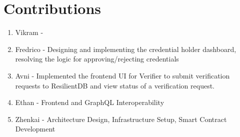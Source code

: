 \section{Contributions}

\begin{enumerate}
    \item Vikram -
    \item Fredrico - Designing and implementing the credential holder dashboard, resolving the logic for approving/rejecting credentials
    \item Avni - Implemented the frontend UI for Verifier to submit verification requests to ResilientDB and view status of a verification request. 
    \item Ethan - Frontend and GraphQL Interoperability
    \item Zhenkai - Architecture Design, Infrastructure Setup, Smart Contract Development
\end{enumerate}


